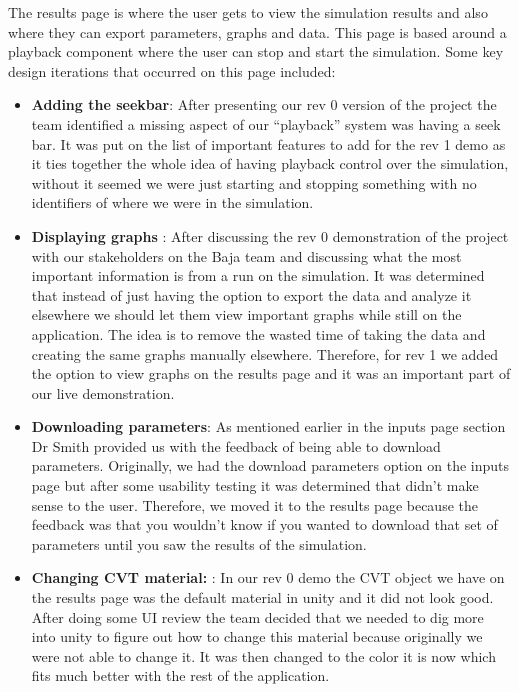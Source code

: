 \documentclass{article}
\begin{document}
\noindent The results page is where the user gets to view the simulation results and also where they can export parameters, graphs and data. This page is based around a playback component where the user can stop and start the simulation. Some key design iterations that occurred on this page included:\\

\begin{itemize}
    \item \textbf{Adding the seekbar}: After presenting our rev 0 version of the project the team identified a missing aspect of our “playback” system was having a seek bar. It was put on the list of important features to add for the rev 1 demo as it ties 
    together the whole idea of having playback control over the simulation, without it seemed we were just starting and stopping something with no identifiers of where we were in the simulation. 
    \item \textbf{ Displaying graphs }: After discussing the rev 0 demonstration of the project with our stakeholders on the Baja team and discussing what the most important information is from a run on the simulation. It was determined that instead of just having the option to export the data and analyze it elsewhere 
    we should let them view important graphs while still on the application. The idea is to remove the wasted time of taking the data and creating the same graphs manually elsewhere. Therefore, for rev 1 we added the option to view graphs on the results page and it was an important part of our live demonstration. 
    \item \textbf{ Downloading parameters}: As mentioned earlier in the inputs page section Dr Smith provided us with the feedback of being able to download parameters. Originally, we had the download parameters option on the inputs page but after some usability testing it was determined that didn’t make sense to the user. 
    Therefore, we moved it to the results page because the feedback was that you wouldn’t know if you wanted to download that set of parameters until you saw the results of the simulation. 
    \item \textbf{ Changing CVT material: }: In our rev 0 demo the CVT object we have on the results page was the default material in unity and it did not look good. After doing some UI review the team decided that we needed to dig more 
    into unity to figure out how to change this material because originally we were not able to change it. It was then changed to the color it is now which fits much better with the rest of the application.
\end{itemize}
\end{document}
